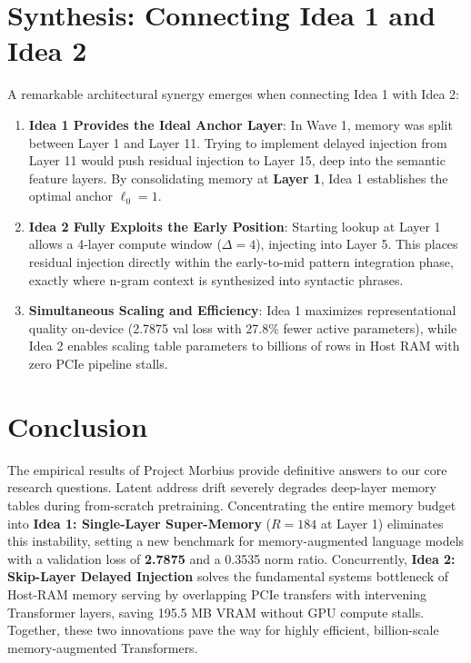 \documentclass[11pt,a4paper]{article}
\begin{document}
\vspace{0.5em}

\section{Synthesis: Connecting Idea 1 and Idea 2}
\label{sec:synthesis}

A remarkable architectural synergy emerges when connecting Idea 1 with Idea 2:
\begin{enumerate}[leftmargin=1.4em, itemsep=2pt]
    \item \textbf{Idea 1 Provides the Ideal Anchor Layer}: In Wave 1, memory was split between Layer 1 and Layer 11. Trying to implement delayed injection from Layer 11 would push residual injection to Layer 15, deep into the semantic feature layers. By consolidating memory at \textbf{Layer 1}, Idea 1 establishes the optimal anchor $\ell_0 = 1$.
    \item \textbf{Idea 2 Fully Exploits the Early Position}: Starting lookup at Layer 1 allows a 4-layer compute window ($\Delta = 4$), injecting into Layer 5. This places residual injection directly within the early-to-mid pattern integration phase, exactly where n-gram context is synthesized into syntactic phrases.
    \item \textbf{Simultaneous Scaling and Efficiency}: Idea 1 maximizes representational quality on-device (2.7875 val loss with 27.8\% fewer active parameters), while Idea 2 enables scaling table parameters to billions of rows in Host RAM with zero PCIe pipeline stalls.
\end{enumerate}

\section{Conclusion}
\label{sec:conclusion}
The empirical results of Project Morbius provide definitive answers to our core research questions. Latent address drift severely degrades deep-layer memory tables during from-scratch pretraining. Concentrating the entire memory budget into \textbf{Idea 1: Single-Layer Super-Memory} ($R = 184$ at Layer 1) eliminates this instability, setting a new benchmark for memory-augmented language models with a validation loss of \textbf{2.7875} and a 0.3535 norm ratio. Concurrently, \textbf{Idea 2: Skip-Layer Delayed Injection} solves the fundamental systems bottleneck of Host-RAM memory serving by overlapping PCIe transfers with intervening Transformer layers, saving 195.5 MB VRAM without GPU compute stalls. Together, these two innovations pave the way for highly efficient, billion-scale memory-augmented Transformers.
\end{document}
